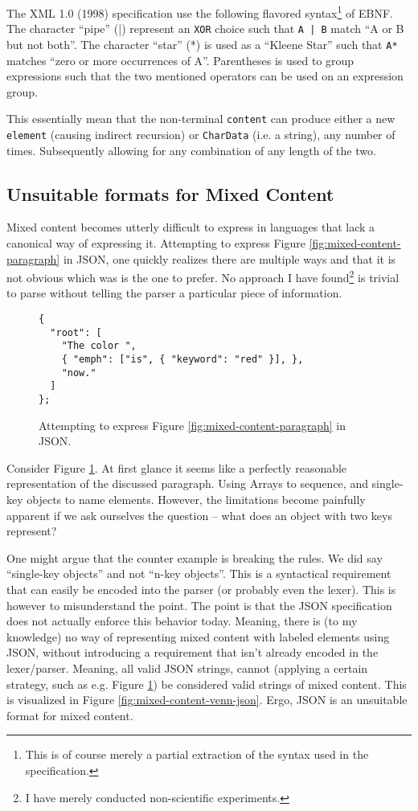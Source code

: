 \documentclass{scrreprt}
\begin{document}
The XML 1.0 (1998) specification use the following flavored syntax\footnote{This is of course merely a partial extraction of the syntax used in the specification.} of EBNF. The character ``pipe'' (|) represent an \texttt{XOR} choice such that \texttt{A | B} match ``A or B but not both''. The character ``star'' (*) is used as a ``Kleene Star'' such that \texttt{A*} matches ``zero or more occurrences of A''. Parentheses is used to group expressions such that the two mentioned operators can be used on an expression group.

This essentially mean that the non-terminal \texttt{content} can produce either a new \texttt{element} (causing indirect recursion) or \texttt{CharData} (i.e. a string), any number of times. Subsequently allowing for any combination of any length of the two.



\subsection{Unsuitable formats for Mixed Content}
Mixed content becomes utterly difficult to express in languages that lack a canonical way of expressing it. Attempting to express Figure \ref{fig:mixed-content-paragraph} in JSON, one quickly realizes there are multiple ways and that it is not obvious which was is the one to prefer. No approach I have found\footnote{I have merely conducted non-scientific experiments.} is trivial to parse without telling the parser a particular piece of information.

\begin{figure}[h]
\begin{lstlisting}
{
  "root": [
    "The color ",
    { "emph": ["is", { "keyword": "red" }], },
    "now."
  ]
};
\end{lstlisting}
\caption{Attempting to express Figure \ref{fig:mixed-content-paragraph} in JSON.}
\label{fig:mixed-content-json}
\end{figure}


Consider Figure \ref{fig:mixed-content-json}. At first glance it seems like a perfectly reasonable representation of the discussed paragraph. Using Arrays to sequence, and single-key objects to name elements. However, the limitations become painfully apparent if we ask ourselves the question -- what does an object with two keys represent?

One might argue that the counter example is breaking the rules. We did say ``single-key objects'' and not ``n-key objects''. This is a syntactical requirement that can easily be encoded into the parser (or probably even the lexer). This is however to misunderstand the point. The point is that the JSON specification does not actually enforce this behavior today. Meaning, there is (to my knowledge) no way of representing mixed content with labeled elements using JSON, without introducing a requirement that isn't already encoded in the lexer/parser. Meaning, all valid JSON strings, cannot (applying a certain strategy, such as e.g. Figure \ref{fig:mixed-content-json}) be considered valid strings of mixed content. This is visualized in Figure \ref{fig:mixed-content-venn-json}. Ergo, JSON is an unsuitable format for mixed content.
\end{document}
